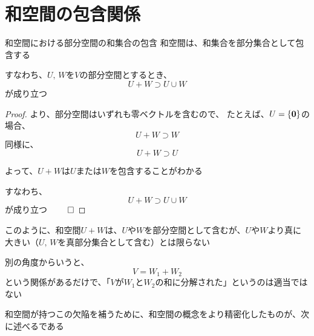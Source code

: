 \documentclass[../../../topic_linear-algebra]{subfiles}
\begin{document}
\sectionline
\section{和空間の包含関係}

\begin{mindflow}
\end{mindflow}

\begin{theorem*}{和空間における部分空間の和集合の包含}
  和空間は、和集合を部分集合として包含する

  すなわち、$U,\,W$を$V$の部分空間とするとき、
  \begin{equation*}
    U + W \supset U \cup W
  \end{equation*}
  が成り立つ
\end{theorem*}

\begin{proof}
  より、部分空間はいずれも零ベクトルを含むので、
  たとえば、$U = \{ \vb*{0} \}$の場合、
  \begin{equation*}
    U + W \supset W
  \end{equation*}
  同様に、
  \begin{equation*}
    U + W \supset U
  \end{equation*}

  よって、$U+W$は$U$または$W$を包含することがわかる

  すなわち、
  \begin{equation*}
    U + W \supset U \cup W
  \end{equation*}
  が成り立つ $\qed$
\end{proof}

\sectionline

このように、和空間$U+W$は、$U$や$W$を部分空間として含むが、$U$や$W$より真に大きい（$U,\,W$を真部分集合として含む）とは限らない

\br

別の角度からいうと、
\begin{equation*}
  V = W_1 + W_2
\end{equation*}
という関係があるだけで、「$V$が$W_1$と$W_2$の和に分解された」というのは適当ではない

\br

和空間が持つこの欠陥を補うために、和空間の概念をより精密化したものが、次に述べるである
\end{document}
